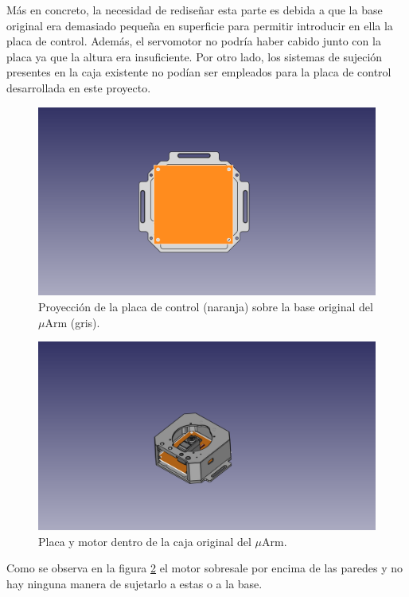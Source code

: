 Más en concreto, la necesidad de rediseñar esta parte es debida a que la base original era demasiado pequeña en superficie para permitir introducir en ella la placa de control. Además, el servomotor no podría haber cabido junto con la placa ya que la altura era insuficiente. Por otro lado, los sistemas de sujeción presentes en la caja existente no podían ser empleados para la placa de control desarrollada en este proyecto.
 
 \begin{figure}[H]
    \centering
    \includegraphics[width=.9\linewidth]{pictures/PlacaYBase.png}
    \caption{Proyección de la placa de control (naranja) sobre la base original del $\mu$Arm (gris).}
    \label{fig:placa_y_base_antiguas}
\end{figure}


 \begin{figure}[H]
    \centering
    \includegraphics[width=.9\linewidth]{pictures/PlacaMotorYParedes1.png}
    \caption{Placa y motor dentro de la caja original del $\mu$Arm.}
    \label{fig:placa_motor_y_paredes1}
\end{figure}

Como se observa en la figura \ref{fig:placa_motor_y_paredes1} el motor sobresale por encima de las paredes y no hay ninguna manera de sujetarlo a estas o a la base.

